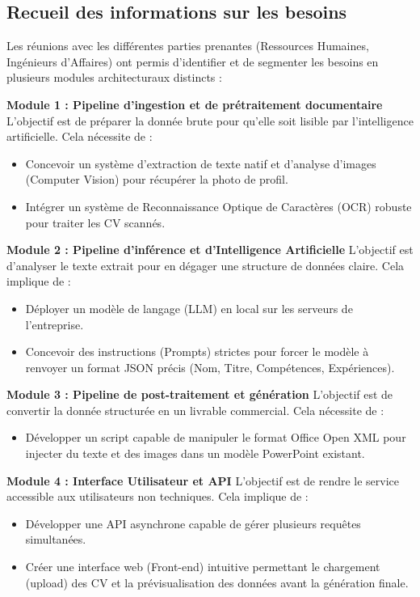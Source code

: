 \subsection{Recueil des informations sur les besoins}
Les réunions avec les différentes parties prenantes (Ressources Humaines, Ingénieurs d'Affaires) ont permis d'identifier et de segmenter les besoins en plusieurs modules architecturaux distincts :

\textbf{Module 1 : Pipeline d'ingestion et de prétraitement documentaire}
L'objectif est de préparer la donnée brute pour qu'elle soit lisible par l'intelligence artificielle. Cela nécessite de :
\begin{itemize}
    \item Concevoir un système d'extraction de texte natif et d'analyse d'images (Computer Vision) pour récupérer la photo de profil.
    \item Intégrer un système de Reconnaissance Optique de Caractères (OCR) robuste pour traiter les CV scannés.
\end{itemize}

\textbf{Module 2 : Pipeline d'inférence et d'Intelligence Artificielle}
L'objectif est d'analyser le texte extrait pour en dégager une structure de données claire. Cela implique de :
\begin{itemize}
    \item Déployer un modèle de langage (LLM) en local sur les serveurs de l'entreprise.
    \item Concevoir des instructions (Prompts) strictes pour forcer le modèle à renvoyer un format JSON précis (Nom, Titre, Compétences, Expériences).
\end{itemize}

\textbf{Module 3 : Pipeline de post-traitement et génération}
L'objectif est de convertir la donnée structurée en un livrable commercial. Cela nécessite de :
\begin{itemize}
    \item Développer un script capable de manipuler le format Office Open XML pour injecter du texte et des images dans un modèle PowerPoint existant.
\end{itemize}

\textbf{Module 4 : Interface Utilisateur et API}
L'objectif est de rendre le service accessible aux utilisateurs non techniques. Cela implique de :
\begin{itemize}
    \item Développer une API asynchrone capable de gérer plusieurs requêtes simultanées.
    \item Créer une interface web (Front-end) intuitive permettant le chargement (upload) des CV et la prévisualisation des données avant la génération finale.
\end{itemize}


